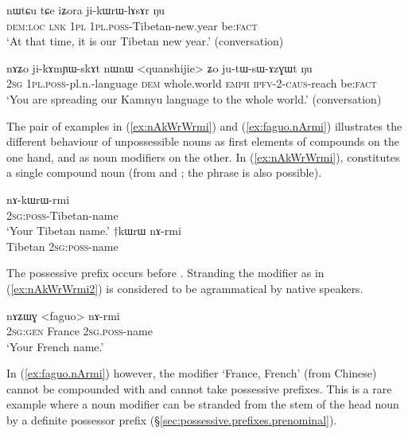 \begin{exe}
\ex \label{ex:jikWrWlAsAr}
 \gll nɯtɕu tɕe iʑora ji-kɯrɯ-lɤsɤr ŋu \\
 \textsc{dem}:\textsc{loc} \textsc{lnk} \textsc{1pl} \textsc{1pl}.\textsc{poss}-Tibetan-new.year be:\textsc{fact} \\
 \glt `At that time, it is our Tibetan new year.' (conversation)
\end{exe}

\begin{exe}
\ex \label{ex:jikAmYWskAt}
 \gll nɤʑo ji-kɤmɲɯ-skɤt nɯnɯ <quanshijie> ʑo ju-tɯ-sɯ-ɤzɣɯt ŋu \\
 \textsc{2sg} \textsc{1pl}.\textsc{poss}-pl.n.-language \textsc{dem} whole.world \textsc{emph} \textsc{ipfv}-2-\textsc{caus}-reach be:\textsc{fact} \\
 \glt `You are spreading our Kamnyu language to the whole world.' (conversation)
\end{exe}

The pair of examples in (\ref{ex:nAkWrWrmi}) and (\ref{ex:faguo.nArmi}) illustrates the different behaviour of unpossessible nouns as first elements of compounds on the one hand, and as noun modifiers on the other. In (\ref{ex:nAkWrWrmi}),  constitutes a single compound noun (from  and ; the phrase  is also possible). 

\begin{exe}
 	\ex \label{ex:nAkWrWrmi}
		\gll nɤ-kɯrɯ-rmi  \\
		\textsc{2sg}:\textsc{poss}-Tibetan-name \\
		\glt `Your Tibetan name.' 
		\ex \label{ex:nAkWrWrmi2}
		\gll $\dagger$kɯrɯ nɤ-rmi  \\
		Tibetan \textsc{2sg}:\textsc{poss}-name \\		
\end{exe}

The possessive prefix occurs before . Stranding the modifier as in (\ref{ex:nAkWrWrmi2}) is considered to be agrammatical by native speakers.
 
\begin{exe}
	\ex \label{ex:faguo.nArmi}
	\gll nɤʑɯɣ <faguo> nɤ-rmi  \\
	\textsc{2sg}:\textsc{gen} France \textsc{2sg}.\textsc{poss}-name \\
	\glt `Your French name.' 
\end{exe}
 
 
In (\ref{ex:faguo.nArmi}) however, the modifier  `France, French' (from Chinese) cannot be compounded with  and cannot take possessive prefixes. This is a rare example where a noun modifier can be stranded from the stem of the head noun by a definite possessor prefix (§\ref{sec:possessive.prefixes.prenominal}).

